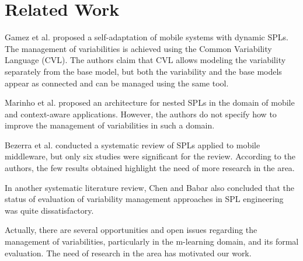 \section{Related Work} \label{section6}


Gamez et al. \cite{gamez14} proposed a self-adaptation of mobile systems with dynamic SPLs. The management of variabilities is achieved using the Common Variability Language (CVL). The authors claim that CVL allows modeling the variability separately from the base model, but both the variability and the base models appear as connected and can be managed using the same tool. %

Marinho et al. \cite{marinho10} proposed an architecture for nested SPLs in the domain of mobile and context-aware applications. However, the authors do not specify how to improve the management of variabilities in such a domain. %

Bezerra et al. \cite{bezerra09} conducted a systematic review of SPLs applied to mobile middleware, but only six studies were significant for the review. According to the authors, the few results obtained highlight the need of more research in the area. %

In another systematic literature review, Chen and Babar \cite{chen11} also concluded that the status of evaluation of variability management approaches in SPL engineering was quite dissatisfactory.

Actually, there are several opportunities and open issues regarding the management of variabilities, particularly in the m-learning domain, and its formal evaluation. The need of research in the area has motivated our work.

